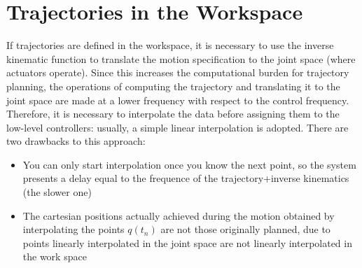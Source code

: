 \documentclass{book}
\begin{document}
\section{Trajectories in the Workspace}
If trajectories are defined in the workspace, it is necessary to use the inverse kinematic function to translate the motion specification to the joint space (where actuators operate). Since this increases the computational burden for trajectory planning, the operations of computing the trajectory and translating it to the joint space are made at a lower frequency with respect to the control frequency. Therefore, it is necessary to interpolate the data before assigning them to the low-level controllers: usually, a simple linear interpolation is adopted.
There are two drawbacks to this approach: 
\begin{itemize}
    \item You can only start interpolation once you know the next point, so the system presents a delay equal to the frequence of the trajectory+inverse kinematics (the slower one) 
    \item The cartesian positions actually achieved during the motion obtained by interpolating the points $q(t_n)$ are not those originally planned, due to points linearly interpolated in the joint space are not linearly interpolated in the work space
\end{itemize}
\end{document}
